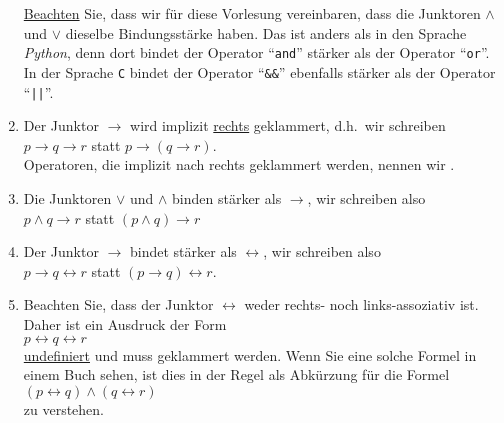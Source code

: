 \begin{enumerate}
      \underline{\color{red}Beachten} Sie, dass wir für diese Vorlesung vereinbaren, dass die Junktoren
      $\wedge$ und $\vee$ dieselbe Bindungsstärke haben.  Das ist anders als in den Sprache \textsl{Python},
      denn dort bindet der Operator ``\texttt{and}'' stärker als der Operator ``\texttt{or}''.
      In der Sprache \texttt{C} bindet der Operator ``\texttt{\&\&}'' ebenfalls stärker als der Operator
      ``\texttt{||}''. 
\item Der Junktor $\rightarrow$ wird implizit \underline{rechts} geklammert, d.h.~wir
      schreiben \\[0.2cm]
      \hspace*{1.3cm} $p \rightarrow q \rightarrow r$ \quad statt \quad $p \rightarrow (q \rightarrow r)$.
      \\[0.2cm]
      Operatoren, die implizit nach rechts geklammert werden, nennen wir .
\item Die Junktoren $\vee$ und $\wedge$ binden stärker als $\rightarrow$, wir schreiben
      also \\[0.2cm]
      \hspace*{1.3cm} $p \wedge q \rightarrow r$ \quad statt \quad $(p \wedge q) \rightarrow r$
\item Der Junktor $\rightarrow$ bindet stärker als $\leftrightarrow$, wir schreiben
      also \\[0.2cm]
      \hspace*{1.3cm} $p \rightarrow q \leftrightarrow r$ \quad statt \quad $(p \rightarrow q) \leftrightarrow
      r$.
\item Beachten Sie, dass der Junktor $\leftrightarrow$ weder rechts- noch links-assoziativ ist.  Daher ist ein
      Ausdruck der Form
      \\[0.2cm]
      \hspace*{1.3cm}
      $p \leftrightarrow q \leftrightarrow r$
      \\[0.2cm]
      \underline{undefiniert} und muss geklammert werden.  Wenn Sie eine solche Formel in einem Buch sehen, ist dies
      in der Regel als Abkürzung für die Formel
      \\[0.2cm]
      \hspace*{1.3cm}
      $(p \leftrightarrow q) \wedge (q \leftrightarrow r)$
      \\[0.2cm]
      zu verstehen.
\end{enumerate}

